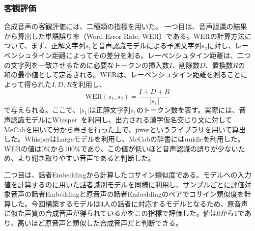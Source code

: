 \documentclass[12pt]{jarticle}
\numberwithin{equation}{section}    %
\numberwithin{figure}{section}      %
\numberwithin{table}{section}      %
\begin{document}
\subsubsection{客観評価}
合成音声の客観評価には、二種類の指標を用いた。
一つ目は、音声認識の結果から算出した単語誤り率（Word Error Rate; WER）である。WERの計算方法について、まず、正解文字列$s_{1}$と音声認識モデルによる予測文字列$s_{2}$に対し、レーベンシュタイン距離によってその差分を測る。レーベンシュタイン距離は、二つの文字列を一致させるために必要なトークンの挿入数$I$、削除数$D$、置換数$R$の和の最小値として定義される。WERは、レーベンシュタイン距離を測ることによって得られた$I, D, R$を利用し、
\begin{equation}
    \text{WER}(s_{1}, s_{2}) = \frac{I + D + R}{|s_{1}|}
\end{equation}
で与えられる。ここで、$|s_{1}|$は正解文字列$s_{1}$のトークン数を表す。実際には、音声認識モデルにWhisper~\cite{radford2023robust}を利用し、出力される漢字仮名交じり文に対してMeCabを用いて分かち書きを行った上で、jiwerというライブラリを用いて算出した。WhisperはLargeモデルを利用し、MeCabの辞書にはunidicを利用した。WERの値は0\%から100\%であり、この値が低いほど音声認識の誤りが少ないため、より聞き取りやすい音声であると判断した。

二つ目は、話者Embeddingから計算したコサイン類似度である。モデルへの入力値を計算するのに用いた話者識別モデルを同様に利用し、サンプルごとに評価対象音声の話者Embeddingと原音声の話者Embeddingのペアでコサイン類似度を計算した。今回構築するモデルは4人の話者に対応するモデルとなるため、原音声に似た声質の合成音声が得られているかをこの指標で評価した。値は0から1であり、高いほど原音声と類似した合成音声だと判断できる。

\end{document}
